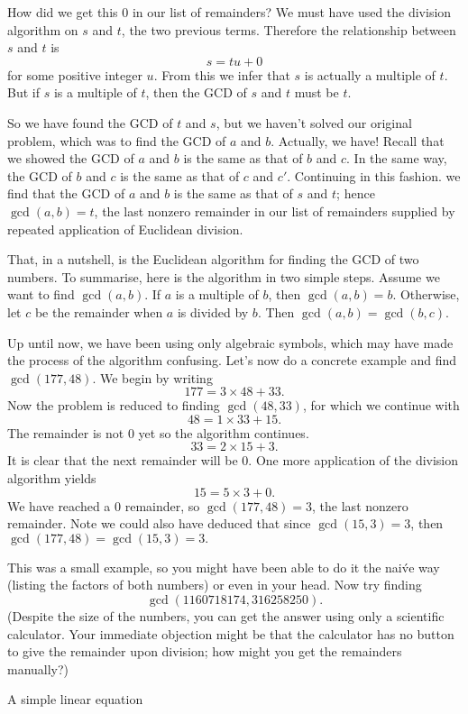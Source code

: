 How did we get this $0$ in our list of remainders? We must have used the division algorithm on $s$ and $t$,
the two previous terms. Therefore the relationship between $s$ and $t$ is
$$s=tu+0$$
for some positive integer $u$. From this we infer that $s$ is actually a multiple of $t$. But if $s$ is a multiple
of $t$, then the GCD of $s$ and $t$ must be $t$.

So we have found the GCD of $t$ and $s$, but we haven't solved our original problem, which was to
find the GCD of $a$ and $b$. Actually, we have! Recall that we showed the GCD of $a$ and $b$ is the same
as that of $b$ and $c$. In the same way, the GCD of $b$ and $c$ is the same as that of $c$ and $c'$. 
Continuing in this fashion. we find that the GCD of $a$ and $b$ is the same as that of $s$ and $t$; hence
$\gcd(a,b)=t$, the last nonzero remainder in our list of remainders supplied by repeated application of Euclidean division.

That, in a nutshell, is the Euclidean algorithm for finding the GCD of two numbers. To summarise, here is the
algorithm in two simple steps. Assume we want to find $\gcd(a,b)$.
\numberedlist
\li If $a$ is a multiple of $b$, then $\gcd(a,b)=b$.
\li Otherwise, let $c$ be the remainder when $a$ is divided by $b$. Then $\gcd(a,b)=\gcd(b,c)$.
\endnumberedlist

Up until now, we have been using only algebraic symbols, which may have made the process of the algorithm
confusing. Let's now do a concrete example and find $\gcd(177,48)$. We begin by writing
$$177=3\times48+33.$$
Now the problem is reduced to finding $\gcd(48,33)$, for which we continue with
$$48=1\times33+15.$$
The remainder is not $0$ yet so the algorithm continues.
$$33=2\times15+3.$$
It is clear that the next remainder will be $0$. One more application
of the division algorithm yields
$$15=5\times3+0.$$
We have reached a $0$ remainder, so $\gcd(177,48)=3$, the last nonzero remainder. Note we could
also have deduced that since $\gcd(15,3)=3$, then $\gcd(177,48)=\gcd(15,3)=3.$

This was a small example, so you might have been able to do it the nai\'ve way (listing
the factors of both numbers) or even in your head. Now try finding $$\gcd(1160718174,316258250).$$
(Despite the size of the numbers, you can get the answer using only a scientific calculator. Your
immediate objection might be that the calculator has no button to give the remainder upon division;
how might you get the remainders manually?)

\beginsection A simple linear equation

